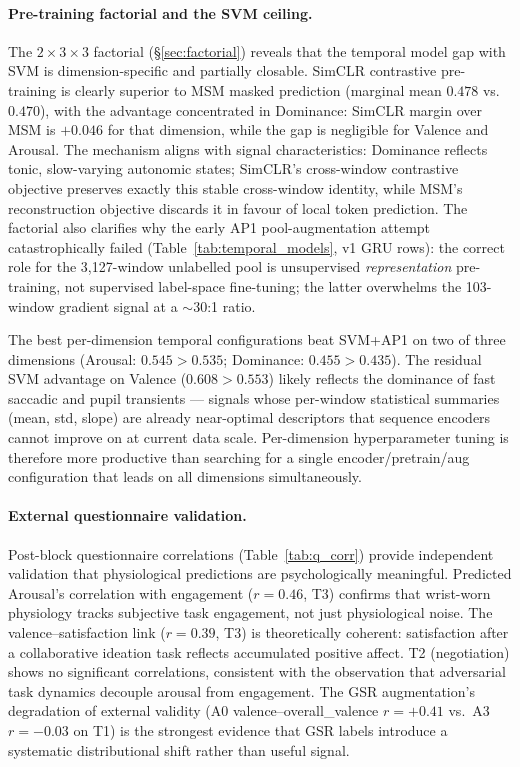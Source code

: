 \documentclass[sigconf,review,anonymous]{acmart}
\begin{document}
\paragraph{Pre-training factorial and the SVM ceiling.}
The $2{\times}3{\times}3$ factorial (\S\ref{sec:factorial}) reveals that the
temporal model gap with SVM is dimension-specific and partially closable.
SimCLR contrastive pre-training is clearly superior to MSM masked prediction
(marginal mean $0.478$ vs.\ $0.470$), with the advantage concentrated in
Dominance: SimCLR margin over MSM is $+0.046$ for that dimension, while the
gap is negligible for Valence and Arousal.
The mechanism aligns with signal characteristics: Dominance reflects tonic,
slow-varying autonomic states; SimCLR's cross-window contrastive objective
preserves exactly this stable cross-window identity, while MSM's
reconstruction objective discards it in favour of local token prediction.
The factorial also clarifies why the early AP1 pool-augmentation attempt
catastrophically failed (Table~\ref{tab:temporal_models}, v1 GRU rows):
the correct role for the 3{,}127-window unlabelled pool is unsupervised
\emph{representation} pre-training, not supervised label-space fine-tuning;
the latter overwhelms the 103-window gradient signal at a $\sim$30:1 ratio.

The best per-dimension temporal configurations beat SVM+AP1 on two of three
dimensions (Arousal: $0.545 > 0.535$; Dominance: $0.455 > 0.435$).
The residual SVM advantage on Valence ($0.608 > 0.553$) likely reflects
the dominance of fast saccadic and pupil transients --- signals whose
per-window statistical summaries (mean, std, slope) are already near-optimal
descriptors that sequence encoders cannot improve on at current data scale.
Per-dimension hyperparameter tuning is therefore more productive than
searching for a single encoder/pretrain/aug configuration that leads on all
dimensions simultaneously.

\paragraph{External questionnaire validation.}
Post-block questionnaire correlations (Table~\ref{tab:q_corr}) provide
independent validation that physiological predictions are psychologically
meaningful.
Predicted Arousal's correlation with engagement ($r{=}0.46$, T3) confirms
that wrist-worn physiology tracks subjective task engagement, not just
physiological noise.
The valence--satisfaction link ($r{=}0.39$, T3) is theoretically coherent:
satisfaction after a collaborative ideation task reflects accumulated positive
affect.
T2 (negotiation) shows no significant correlations, consistent with the
observation that adversarial task dynamics decouple arousal from engagement.
The GSR augmentation's degradation of external validity (A0 valence--overall\_valence
$r{=}{+}0.41$ vs.\ A3 $r{=}{-}0.03$ on T1) is the strongest evidence that
GSR labels introduce a systematic distributional shift rather than useful signal.
\end{document}
